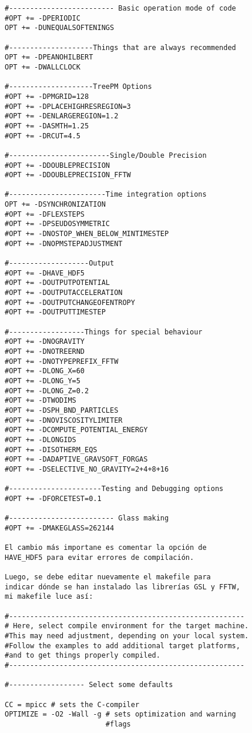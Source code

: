 \documentclass[a4paper,openright,12pt]{book}
\begin{document}
\begin{enumerate}
\begin{verbatim}
#------------------------- Basic operation mode of code
#OPT += -DPERIODIC
OPT += -DUNEQUALSOFTENINGS

#--------------------Things that are always recommended
OPT += -DPEANOHILBERT
OPT += -DWALLCLOCK

#--------------------TreePM Options
#OPT += -DPMGRID=128
#OPT += -DPLACEHIGHRESREGION=3
#OPT += -DENLARGEREGION=1.2
#OPT += -DASMTH=1.25
#OPT += -DRCUT=4.5

#------------------------Single/Double Precision
#OPT += -DDOUBLEPRECISION
#OPT += -DDOUBLEPRECISION_FFTW

#-----------------------Time integration options
OPT += -DSYNCHRONIZATION
#OPT += -DFLEXSTEPS
#OPT += -DPSEUDOSYMMETRIC
#OPT += -DNOSTOP_WHEN_BELOW_MINTIMESTEP
#OPT += -DNOPMSTEPADJUSTMENT

#-------------------Output
#OPT += -DHAVE_HDF5
#OPT += -DOUTPUTPOTENTIAL
#OPT += -DOUTPUTACCELERATION
#OPT += -DOUTPUTCHANGEOFENTROPY
#OPT += -DOUTPUTTIMESTEP

#------------------Things for special behaviour
#OPT += -DNOGRAVITY
#OPT += -DNOTREERND
#OPT += -DNOTYPEPREFIX_FFTW
#OPT += -DLONG_X=60
#OPT += -DLONG_Y=5
#OPT += -DLONG_Z=0.2
#OPT += -DTWODIMS
#OPT += -DSPH_BND_PARTICLES
#OPT += -DNOVISCOSITYLIMITER
#OPT += -DCOMPUTE_POTENTIAL_ENERGY
#OPT += -DLONGIDS
#OPT += -DISOTHERM_EQS
#OPT += -DADAPTIVE_GRAVSOFT_FORGAS
#OPT += -DSELECTIVE_NO_GRAVITY=2+4+8+16

#----------------------Testing and Debugging options
#OPT += -DFORCETEST=0.1

#------------------------- Glass making
#OPT += -DMAKEGLASS=262144

El cambio más importane es comentar la opción de
HAVE_HDF5 para evitar errores de compilación.

Luego, se debe editar nuevamente el makefile para 
indicar dónde se han instalado las librerías GSL y FFTW,
mi makefile luce así:

#--------------------------------------------------------
# Here, select compile environment for the target machine. 
#This may need adjustment, depending on your local system. 
#Follow the examples to add additional target platforms, 
#and to get things properly compiled.
#--------------------------------------------------------

#------------------ Select some defaults

CC = mpicc # sets the C-compiler
OPTIMIZE = -O2 -Wall -g # sets optimization and warning 
                        #flags


\end{verbatim}
\end{enumerate}
\end{document}
